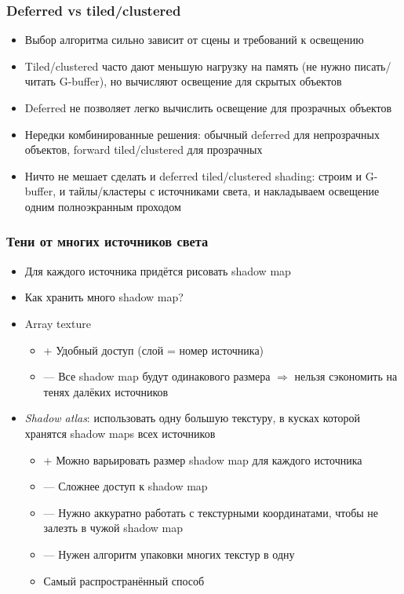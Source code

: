 \documentclass[10pt]{beamer}
\begin{document}
\begin{frame}[fragile]
\frametitle{Deferred vs tiled/clustered}
\begin{itemize}
\item Выбор алгоритма сильно зависит от сцены и требований к освещению
\pause
\item Tiled/clustered часто дают меньшую нагрузку на память (не нужно писать/читать G-buffer), но вычисляют освещение для скрытых объектов
\pause
\item Deferred не позволяет легко вычислить освещение для прозрачных объектов
\pause
\item Нередки комбинированные решения: обычный deferred для непрозрачных объектов, forward tiled/clustered для прозрачных
\pause
\item Ничто не мешает сделать и deferred tiled/clustered shading: строим и G-buffer, и тайлы/кластеры с источниками света, и накладываем освещение одним полноэкранным проходом
\end{itemize}
\end{frame}

\begin{frame}[fragile]
\frametitle{Тени от многих источников света}
\begin{itemize}
\item Для каждого источника придётся рисовать shadow map
\pause
\item Как хранить много shadow map?
\pause
\item Array texture
\begin{itemize}
\item {\color{green}+} Удобный доступ (слой = номер источника)
\item {\color{red}—} Все shadow map будут одинакового размера \begin{math}\Rightarrow\end{math} нельзя сэкономить на тенях далёких источников
\end{itemize}
\pause
\item \textit{Shadow atlas}: использовать одну большую текстуру, в кусках которой хранятся shadow maps всех источников
\begin{itemize}
\item {\color{green}+} Можно варьировать размер shadow map для каждого источника
\item {\color{red}—} Сложнее доступ к shadow map
\item {\color{red}—} Нужно аккуратно работать с текстурными координатами, чтобы не залезть в чужой shadow map
\item {\color{red}—} Нужен алгоритм упаковки многих текстур в одну
\item Самый распространённый способ
\end{itemize}
\end{itemize}
\end{frame}
\end{document}
